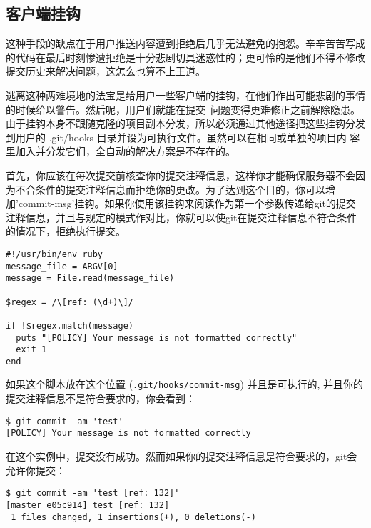 \documentclass[a4paper]{book}
\begin{document}
\subsection{客户端挂钩}

这种手段的缺点在于用户推送内容遭到拒绝后几乎无法避免的抱怨。辛辛苦苦写成的代码在最后时刻惨遭拒绝是十分悲剧切具迷惑性的；更可怜的是他们不得不修改提交历史来解决问题，这怎么也算不上王道。

逃离这种两难境地的法宝是给用户一些客户端的挂钩，在他们作出可能悲剧的事情的时候给以警告。然后呢，用户们就能在提交--问题变得更难修正之前解除隐患。由于挂钩本身不跟随克隆的项目副本分发，所以必须通过其他途径把这些挂钩分发到用户的 .git/hooks 目录并设为可执行文件。虽然可以在相同或单独的项目内 容里加入并分发它们，全自动的解决方案是不存在的。

首先，你应该在每次提交前核查你的提交注释信息，这样你才能确保服务器不会因为不合条件的提交注释信息而拒绝你的更改。为了达到这个目的，你可以增加'commit-msg'挂钩。如果你使用该挂钩来阅读作为第一个参数传递给git的提交注释信息，并且与规定的模式作对比，你就可以使git在提交注释信息不符合条件的情况下，拒绝执行提交。

\begin{shaded}\begin{verbatim}
#!/usr/bin/env ruby
message_file = ARGV[0]
message = File.read(message_file)

$regex = /\[ref: (\d+)\]/

if !$regex.match(message)
  puts "[POLICY] Your message is not formatted correctly"
  exit 1
end
\end{verbatim}\end{shaded}

如果这个脚本放在这个位置 (\texttt{.git/hooks/commit-msg}) 并且是可执行的, 并且你的提交注释信息不是符合要求的，你会看到：

\begin{shaded}\begin{verbatim}
$ git commit -am 'test'
[POLICY] Your message is not formatted correctly
\end{verbatim}\end{shaded}

在这个实例中，提交没有成功。然而如果你的提交注释信息是符合要求的，git会允许你提交：

\begin{shaded}\begin{verbatim}
$ git commit -am 'test [ref: 132]'
[master e05c914] test [ref: 132]
 1 files changed, 1 insertions(+), 0 deletions(-)
\end{verbatim}\end{shaded}
\end{document}
